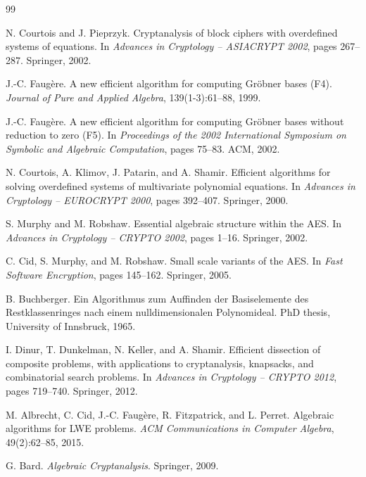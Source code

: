 \documentclass[12pt,a4paper]{article}
\begin{document}
\begin{thebibliography}{99}

N. Courtois and J. Pieprzyk.
\newblock Cryptanalysis of block ciphers with overdefined systems of equations.
\newblock In \emph{Advances in Cryptology -- ASIACRYPT 2002}, pages 267--287. Springer, 2002.

J.-C. Faugère.
\newblock A new efficient algorithm for computing Gröbner bases (F4).
\newblock \emph{Journal of Pure and Applied Algebra}, 139(1-3):61--88, 1999.

J.-C. Faugère.
\newblock A new efficient algorithm for computing Gröbner bases without reduction to zero (F5).
\newblock In \emph{Proceedings of the 2002 International Symposium on Symbolic and Algebraic Computation}, pages 75--83. ACM, 2002.

N. Courtois, A. Klimov, J. Patarin, and A. Shamir.
\newblock Efficient algorithms for solving overdefined systems of multivariate polynomial equations.
\newblock In \emph{Advances in Cryptology -- EUROCRYPT 2000}, pages 392--407. Springer, 2000.

S. Murphy and M. Robshaw.
\newblock Essential algebraic structure within the AES.
\newblock In \emph{Advances in Cryptology -- CRYPTO 2002}, pages 1--16. Springer, 2002.

C. Cid, S. Murphy, and M. Robshaw.
\newblock Small scale variants of the AES.
\newblock In \emph{Fast Software Encryption}, pages 145--162. Springer, 2005.

B. Buchberger.
\newblock Ein Algorithmus zum Auffinden der Basiselemente des Restklassenringes nach einem nulldimensionalen Polynomideal.
\newblock PhD thesis, University of Innsbruck, 1965.

I. Dinur, T. Dunkelman, N. Keller, and A. Shamir.
\newblock Efficient dissection of composite problems, with applications to cryptanalysis, knapsacks, and combinatorial search problems.
\newblock In \emph{Advances in Cryptology -- CRYPTO 2012}, pages 719--740. Springer, 2012.

M. Albrecht, C. Cid, J.-C. Faugère, R. Fitzpatrick, and L. Perret.
\newblock Algebraic algorithms for LWE problems.
\newblock \emph{ACM Communications in Computer Algebra}, 49(2):62--85, 2015.

G. Bard.
\newblock \emph{Algebraic Cryptanalysis}.
\newblock Springer, 2009.


\end{thebibliography}
\end{document}
